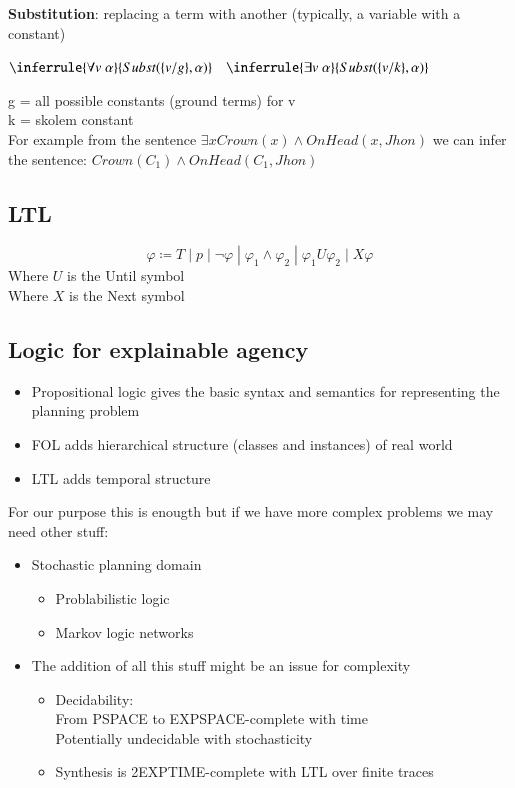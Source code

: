 \textbf{Substitution}: replacing a term with another (typically, a variable with a constant)

$\inferrule{\forall v\;\alpha}{Subst(\{v/g\}, \alpha)}\quad \inferrule{\exists v\;\alpha}{Subst(\{v/k\}, \alpha)}$

g = all possible constants (ground terms) for v\\
k = skolem constant\\

For example from the sentence $\exists x Crown(x)\land OnHead(x, Jhon)$ we can infer the sentence:
$Crown(C_1)\land OnHead(C_1, Jhon)$

\subsection{LTL}
\begin{equation*}
    \varphi \coloneqq T \;|\; p \;|\; \lnot\varphi \;|\; \varphi_1 \land \varphi_2 \;|\; \varphi_1 U \varphi_2 \;|\; X\varphi
\end{equation*}
Where $U$ is the Until symbol\\
Where $X$ is the Next symbol\\

\subsection{Logic for explainable agency}
\begin{itemize}
    \item Propositional logic gives the basic syntax and semantics for representing the planning problem
    \item FOL adds hierarchical structure (classes and instances) of real world
    \item LTL adds temporal structure
\end{itemize}
For our purpose this is enougth but if we have more complex problems we may need other stuff:
\begin{itemize}
    \item Stochastic planning domain
    \begin{itemize}
        \item Problabilistic logic
        \item Markov logic networks
    \end{itemize}
    \item The addition of all this stuff might be an issue for complexity
    \begin{itemize}
        \item Decidability:\\
        From PSPACE to EXPSPACE-complete with time\\
        Potentially undecidable with stochasticity
        \item Synthesis is 2EXPTIME-complete with LTL over finite traces
    \end{itemize}
\end{itemize}